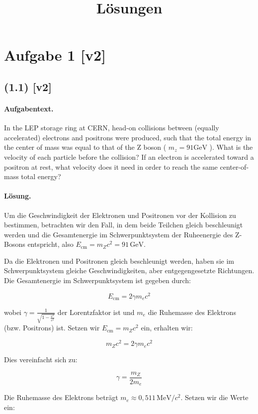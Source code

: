 \documentclass[11pt,a4paper]{article}
\title{Lösungen}
\date{}
\begin{document}
\maketitle

\section*{Aufgabe 1 [v2]}
\subsection*{(1.1) [v2]}
\paragraph{Aufgabentext.}
In the LEP storage ring at CERN, head-on collisions between (equally accelerated) electrons and positrons were produced, such that the total energy in the center of mass was equal to that of the Z boson ( $m_z=91 \mathrm{GeV}$ ). What is the velocity of each particle before the collision? If an electron is accelerated toward a positron at rest, what velocity does it need in order to reach the same center-of-mass total energy?

\paragraph{Lösung.}
Um die Geschwindigkeit der Elektronen und Positronen vor der Kollision zu bestimmen, betrachten wir den Fall, in dem beide Teilchen gleich beschleunigt werden und die Gesamtenergie im Schwerpunktsystem der Ruheenergie des Z-Bosons entspricht, also \( E_{\text{cm}} = m_Z c^2 = 91 \, \text{GeV} \).

Da die Elektronen und Positronen gleich beschleunigt werden, haben sie im Schwerpunktsystem gleiche Geschwindigkeiten, aber entgegengesetzte Richtungen. Die Gesamtenergie im Schwerpunktsystem ist gegeben durch:

\[
E_{\text{cm}} = 2 \gamma m_e c^2
\]

wobei \( \gamma = \frac{1}{\sqrt{1 - \frac{v^2}{c^2}}} \) der Lorentzfaktor ist und \( m_e \) die Ruhemasse des Elektrons (bzw. Positrons) ist. Setzen wir \( E_{\text{cm}} = m_Z c^2 \) ein, erhalten wir:

\[
m_Z c^2 = 2 \gamma m_e c^2
\]

Dies vereinfacht sich zu:

\[
\gamma = \frac{m_Z}{2 m_e}
\]

Die Ruhemasse des Elektrons beträgt \( m_e \approx 0{,}511 \, \text{MeV}/c^2 \). Setzen wir die Werte ein:
\end{document}
